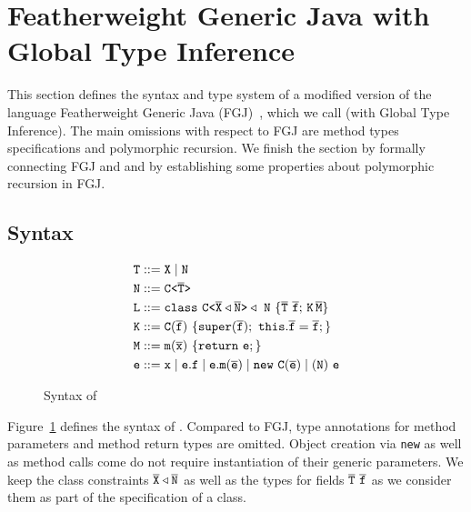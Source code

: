 \section{Featherweight Generic Java with Global Type Inference}
\label{sec:preliminaries}

This section defines the syntax and type system of a modified version
of the language Featherweight Generic Java
(FGJ)~\cite{DBLP:journals/toplas/IgarashiPW01}, which we call \TFGJ
(with Global Type Inference). The main omissions with respect to FGJ are method types specifications
and polymorphic recursion. We finish the section by formally
connecting FGJ and \TFGJ and by establishing some properties about
polymorphic recursion in FGJ.

\subsection{Syntax}\label{chapter:syntax}
\begin{figure}[tp]
\begin{align*}
  \mv T &::= \mv X \mid \mv N \\
  \mv N &::= \exptype{C}{\ol{T}}\\
  \mv L &::= \mathtt{class} \ \exptype{C}{\ol{X} \triangleleft \ol{N}} \triangleleft \ \mv N\ \{ \ol{T} \ \ol{f}; \,\mv K \, \ol{M} \} \\
  \mv K &::= \mv C(\ol{f})\ \{\mathtt{super}(\ol{f}); \ \mathtt{this}.\ol{f}=\ol{f};\} \\
  \mv M &::= \mathtt{m}(\ol{x})\ \{ \mathtt{ return}\ \mv e; \} \\
  \mv e &::= \mv x \mid \mv e.\mv f \mid
             \mv e.\mathtt{m}(\ol{e}) \mid \mathtt{new}\ \mathtt{C}(\ol{e})
             \mid (\mv N)\ \mv e
\end{align*}
  \caption{Syntax of \TFGJ}
  \label{fig:syntax-tfgj}
\end{figure}
Figure~\ref{fig:syntax-tfgj} defines the syntax of \TFGJ.
Compared to FGJ,
type annotations for method parameters and method return types are omitted.
Object creation via \texttt{new} as well as method calls come do not
require instantiation of their generic parameters.
We keep the class constraints ${\overline{\tt X} \triangleleft \overline{\tt N}}$ as well as the types
for fields $\overline{\tt T} \ \overline{\tt f}$ as we consider them as part of the
specification of a class.

